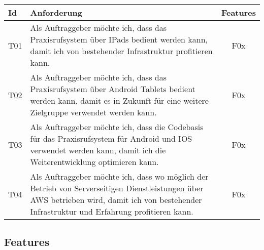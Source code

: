 \begin{table}[h]
    \centering
    \begin{tabular}{|l|p{13cm}|c|}
        \hline
        \textbf{Id} & \textbf{Anforderung}                                                                                                                                                                          & \textbf{Features} \\
        \hline
        T01         & Als Auftraggeber möchte ich, dass das Praxisrufsystem über IPads bedient werden kann, damit ich von bestehender Infrastruktur profitieren kann. & F0x \\
        \hline
        T02         & Als Auftraggeber möchte ich, dass das Praxisrufsystem über Android Tablets bedient werden kann, damit es in Zukunft für eine weitere Zielgruppe verwendet werden kann. & F0x \\
        \hline
        T03         & Als Auftraggeber möchte ich, dass die Codebasis für das Praxisrufsystem für Android und IOS verwendet werden kann, damit ich die Weiterentwicklung optimieren kann. & F0x \\
        \hline
        T04         & Als Auftraggeber möchte ich, dass wo möglich der Betrieb von Serverseitigen Dienstleistungen über AWS betrieben wird, damit ich von bestehender Infrastruktur und Erfahrung profitieren kann. & F0x               \\
        \hline
    \end{tabular}\label{tab:userstories3}
\end{table}

\clearpage

\subsection{Features}\label{subsec:features}

